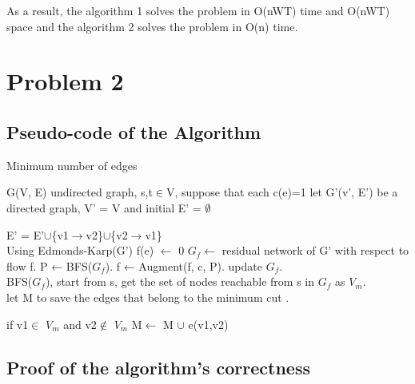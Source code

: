 \documentclass[]{article}
\begin{document}
	\noindent As a result, the algorithm 1 solves the problem in O(nWT) time and O(nWT) space and the algorithm 2 solves the problem in O(n) time.  \\
	
	\clearpage
	
	\section{Problem 2}
	
	\subsection{Pseudo-code of the Algorithm}
	\begin{algorithm}  
		\caption{Minimum number of edges}  
		\begin{algorithmic} 
			\Require G(V, E) undirected graph, s,t$\in$V, suppose that each c(e)=1
			\Ensure
			\State let G'(v', E') be a directed graph, V' = V and initial E' = $\emptyset$
			
				\State E' = E'$\cup$\{v1$\rightarrow$v2\}$\cup$\{v2$\rightarrow$v1\}
			\EndFor  \\
			
			\State Using Edmonds-Karp(G')
				\State f(e) $\leftarrow$ 0
			\EndFor
			\State $G_{f}$$\leftarrow$ residual network of G' with respect to flow f.
				\State P ← BFS($G_{f}$).
				\State f ← Augment(f, c, P).
				\State update $G_{f}$.
			\EndWhile   \\
			
			\State BFS($G_{f}$), start from s, get the set of nodes reachable from s in $G_{f}$ as $V_{m}$.  \\
			
			\State let M to save the edges that belong to the minimum cut .  
			
				\State if v1$\in$ $V_{m}$ and v2$\notin$ $V_{m}$
				\State M$\leftarrow$ M $\cup$ e(v1,v2)
			\EndFor
			
		\end{algorithmic}  
	\end{algorithm} 
	
	\subsection{Proof of the algorithm's correctness}
	
\end{document}
